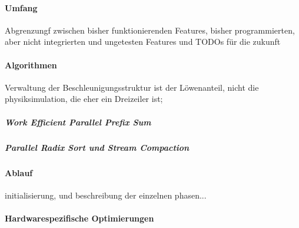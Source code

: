 	\paragraph{Umfang}
		Abgrenzungf zwischen bisher funktionierenden Features, bisher programmierten, aber nicht integrierten und 
		ungetesten Features und TODOs für die zukunft

	\paragraph{Algorithmen}
	Verwaltung der Beschleunigungsstruktur ist der Löwenanteil, nicht die physiksimulation, die eher ein Dreizeiler 
	ist;
		\subparagraph{Work Efficient Parallel Prefix Sum}
		
		\subparagraph{Parallel Radix Sort und Stream Compaction}
		
	\paragraph{Ablauf}
		\label{sec:fluidSim:ablauf}
		initialisierung, und beschreibung der einzelnen phasen...

	\paragraph{Hardwarespezifische Optimierungen}
	\label{sec:hardwareOptimizations}

\clearpage
